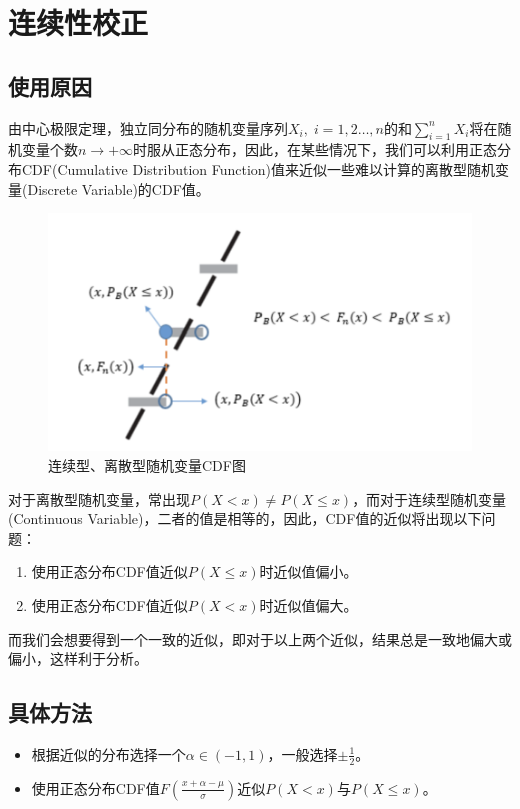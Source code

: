 \section{连续性校正}

\subsection{使用原因}
由中心极限定理，独立同分布的随机变量序列$X_i,\;i=1,2\dots,n$的和$\sum\limits_{i=1}^{n}X_i$将在随机变量个数$n\to+\infty$时服从正态分布，因此，在某些情况下，我们可以利用正态分布CDF(Cumulative Distribution Function)值来近似一些难以计算的离散型随机变量(Discrete Variable)的CDF值。

\begin{figure}[htbp] 
	\centering 
	\includegraphics{probability-theory/chapter4/CDF-of-c-and-d-variables.png} 
	\caption{连续型、离散型随机变量CDF图} 
\end{figure}

\hspace{2em}对于离散型随机变量，常出现$P(X<x)\ne P(X\leqslant x)$，而对于连续型随机变量(Continuous Variable)，二者的值是相等的，因此，CDF值的近似将出现以下问题：
\begin{enumerate}
	\item 使用正态分布CDF值近似$P(X\leqslant x)$时近似值偏小。
	\item 使用正态分布CDF值近似$P(X< x)$时近似值偏大。
\end{enumerate}
\hspace{2em}而我们会想要得到一个一致的近似，即对于以上两个近似，结果总是一致地偏大或偏小，这样利于分析。

\subsection{具体方法}
\begin{itemize}
	\item 根据近似的分布选择一个$\alpha\in (-1,1)$，一般选择$\pm\frac{1}{2}$。
	\item 使用正态分布CDF值$F(\frac{x+\alpha-\mu}{\sigma})$近似$P(X< x)$与$P(X\leqslant x)$。
\end{itemize}